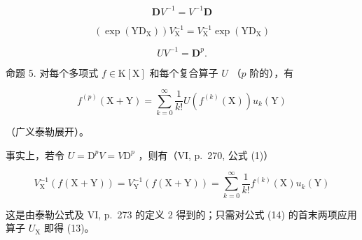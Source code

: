 \[
\mathbf {D} V ^ {- 1} = V ^ {- 1} \mathbf {D}\tag{10}
\]

\[
\left(\exp \left(\mathrm{YD} _ {\mathrm{X}}\right)\right) V _ {\mathrm{X}} ^ {- 1} = V _ {\mathrm{X}} ^ {- 1} \exp \left(\mathrm{YD} _ {\mathrm{X}}\right)\tag{11}
\]

\[
U V ^ {- 1} = \mathbf {D} ^ {p}.\tag{12}
\]

命题 5. 对每个多项式 \(f \in \mathrm{K}[\mathrm{X}]\) 和每个复合算子 \(U\) （\(p\) 阶的），有

\[
f ^ {(p)} (\mathrm{X} + \mathrm{Y}) = \sum_ {k = 0} ^ {\infty} \frac {1}{k !} U (f ^ {(k)} (\mathrm{X})) u _ {k} (\mathrm{Y})\tag{13}
\]

（广义泰勒展开）。

事实上，若令 \(U = \mathrm{D}^p V = V\mathrm{D}^p\) ，则有（VI, p.~270, 公式 (1)）

\[
V _ {\mathrm{X}} ^ {- 1} (f (\mathrm{X} + \mathrm{Y})) = V _ {\mathrm{Y}} ^ {- 1} (f (\mathrm{X} + \mathrm{Y})) = \sum_ {k = 0} ^ {\infty} \frac {1}{k !} f ^ {(k)} (\mathrm{X}) u _ {k} (\mathrm{Y})\tag{14}
\]

这是由泰勒公式及 VI, p.~273 的定义 2 得到的；只需对公式 (14) 的首末两项应用算子 \(U_{\mathrm{X}}\) 即得 (13)。

